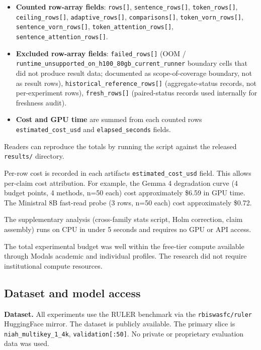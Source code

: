 \documentclass[10pt]{article}
\providecommand{\tightlist}{%
 \setlength{\itemsep}{0pt}\setlength{\parskip}{0pt}}
\begin{document}
\begin{itemize}
\tightlist
\item
 \textbf{Counted row-array fields}: \texttt{rows{[}{]}},
 \texttt{sentence\_rows{[}{]}}, \texttt{token\_rows{[}{]}},
 \texttt{ceiling\_rows{[}{]}}, \texttt{adaptive\_rows{[}{]}},
 \texttt{comparisons{[}{]}}, \texttt{token\_vorn\_rows{[}{]}},
 \texttt{sentence\_vorn\_rows{[}{]}},
 \texttt{token\_attention\_rows{[}{]}},
 \texttt{sentence\_attention\_rows{[}{]}}.
\item
 \textbf{Excluded row-array fields}: \texttt{failed\_rows{[}{]}} (OOM /
 \texttt{runtime\_unsupported\_\allowbreak{}on\_h100\_\allowbreak{}80gb\_\allowbreak{}current\_runner}
 boundary cells that did not produce result data; documented as
 scope-of-coverage boundary, not as result rows),
 \texttt{historical\_reference\_rows{[}{]}} (aggregate-status records,
 not per-experiment rows), \texttt{fresh\_rows{[}{]}} (paired-status
 records used internally for freshness audit).
\item
 \textbf{Cost and GPU time} are summed from each counted
 row\textquotesingle s \texttt{estimated\_cost\_usd} and
 \texttt{elapsed\_seconds} fields.
\end{itemize}

Readers can reproduce the totals by running the script against the
released \texttt{results/} directory.

Per-row cost is recorded in each artifact\textquotesingle s
\texttt{estimated\_cost\_usd} field. This allows per-claim cost
attribution. For example, the Gemma 4 degradation curve (4 budget
points, 4 methods, n=50 each) cost approximately \$6.59 in GPU time. The
Ministral 8B fast-read probe (3 rows, n=50 each) cost approximately
\$0.72.

The supplementary analysis (cross-family stats script, Holm correction,
claim assembly) runs on CPU in under 5 seconds and requires no GPU or
API access.

The total experimental budget was well within the free-tier compute
available through Modal\textquotesingle s academic and individual
profiles. The research did not require institutional compute resources.

\subsection{Dataset and model access}\label{a6-dataset-and-model-access}

\textbf{Dataset.} All experiments use the RULER benchmark via the
\texttt{rbiswasfc/ruler} HuggingFace mirror. The dataset is publicly
available. The primary slice is \texttt{niah\_multikey\_1\_4k},
\texttt{validation{[}:50{]}}. No private or proprietary evaluation data
was used.
\end{document}
